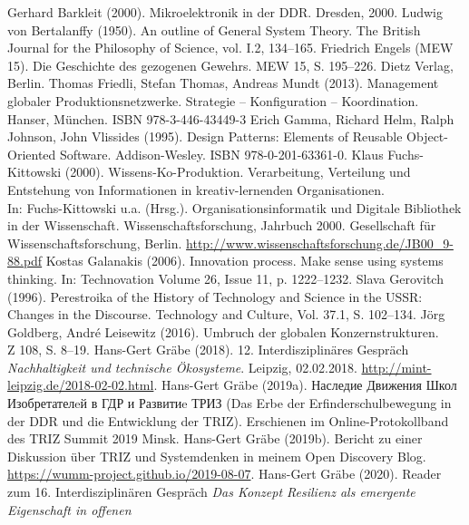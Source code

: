 \documentclass[11pt,a4paper]{article}
\begin{document}
\begin{thebibliography}{xxx}
 Gerhard Barkleit (2000). Mikroelektronik in der
  DDR. Dresden, 2000.
 Ludwig von Bertalanffy (1950). An outline of General
  System Theory. The British Journal for the Philosophy of Science, vol. I.2,
  134–165.
 Friedrich Engels (MEW 15). Die Geschichte des gezogenen
  Gewehrs.  MEW 15, S. 195--226. Dietz Verlag, Berlin.
 Thomas Friedli, Stefan Thomas, Andreas Mundt (2013).
  Management globaler Produktionsnetzwerke. Strategie – Konfiguration –
  Koordination. Hanser, München. ISBN 978-3-446-43449-3
 Erich Gamma, Richard Helm, Ralph Johnson, John Vlissides
  (1995). Design Patterns: Elements of Reusable Object-Oriented Software.
  Addison-Wesley. ISBN 978-0-201-63361-0.
 Klaus Fuchs-Kittowski (2000).  Wissens-Ko-Produktion.
  Verarbeitung, Verteilung und Entstehung von Informationen in
  kreativ-lernenden Organisationen.\\ In: Fuchs-Kittowski u.a.
  (Hrsg.). Organisationsinformatik und Digitale Bibliothek in der
  Wissenschaft. Wissenschaftsforschung, Jahrbuch 2000. Gesellschaft für
  Wissenschaftsforschung, Berlin.
  \url{http://www.wissenschaftsforschung.de/JB00_9-88.pdf}
 Kostas Galanakis (2006).  Innovation process. Make
  sense using systems thinking.  In: Technovation Volume 26, Issue 11,
  p. 1222--1232.
 Slava Gerovitch (1996). Perestroika of the History of
  Technology and Science in the USSR: Changes in the Discourse. Technology and
  Culture, Vol. 37.1, S. 102--134.
 Jörg Goldberg, André Leisewitz (2016). Umbruch der
  globalen Konzernstrukturen.\\ Z 108, S. 8--19.
 Hans-Gert Gräbe (2018).  12. Interdisziplinäres Gespräch
  \emph{Nachhaltigkeit und technische Ökosysteme}. Leipzig, 02.02.2018. 
  \url{http://mint-leipzig.de/2018-02-02.html}.
 Hans-Gert Gräbe (2019a).
  \foreignlanguage{russian}{Наследие Движения Школ Изобретателeй в ГДР и
    Развитиe ТРИЗ} (Das Erbe der Erfinderschulbewegung in der DDR und die
  Entwicklung der TRIZ). Erschienen im Online-Protokollband des TRIZ Summit
  2019 Minsk.
 Hans-Gert Gräbe (2019b).  Bericht zu einer Diskussion
  über TRIZ und Systemdenken in meinem Open Discovery Blog.
  \url{https://wumm-project.github.io/2019-08-07}.
 Hans-Gert Gräbe (2020). Reader zum 16. Interdisziplinären
  Gespräch \emph{Das Konzept Resilienz als emergente Eigenschaft in offenen
}
\end{thebibliography}
\end{document}
